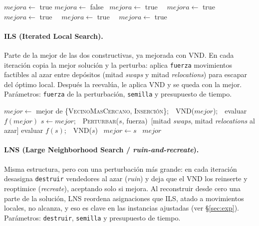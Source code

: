 \documentclass[11pt,a4paper]{article}
\newcommand{\code}[1]{\texttt{#1}}
\begin{document}
\begin{algorithm}[H]
\caption{Metaheurística: VND (Variable Neighborhood Descent)}
\begin{algorithmic}[1]
  \State $mejora \gets$ true
    \State $mejora \gets$ false
    \ $mejora \gets$ true\ \EndWhile
    \ $mejora \gets$ true\ \EndWhile
      \ $mejora \gets$ true\ \EndWhile
      \ $mejora \gets$ true\ \EndWhile
    \EndFor
    \ $mejora \gets$ true\ \EndWhile
  \EndWhile
\EndFunction
\end{algorithmic}
\end{algorithm}

\paragraph{ILS (Iterated Local Search).} Parte de la mejor de las dos constructivas, ya mejorada
con VND. En cada iteración copia la mejor solución y la perturba: aplica \code{fuerza}
movimientos factibles al azar entre depósitos (mitad \emph{swaps} y mitad \emph{relocations})
para escapar del óptimo local. Después la reevalúa, le aplica VND y se queda con la mejor.
Parámetros: \code{fuerza} de la perturbación, \code{semilla} y presupuesto de tiempo.

\begin{algorithm}[H]
\caption{Metaheurística: ILS (Iterated Local Search)}
\begin{algorithmic}[1]
  \State $mejor \gets$ mejor de \{\textsc{VecinoMasCercano}, \textsc{Inserción}\};\ \ \textsc{VND}($mejor$);\ \ evaluar $f(mejor)$
    \State $s \gets mejor$;\ \ \textsc{Perturbar}($s$, fuerza)\ \small{[mitad \textit{swaps}, mitad \textit{relocations} al azar]}
    \State evaluar $f(s)$;\ \ \textsc{VND}($s$)
    \ $mejor \gets s$\ \EndIf
  \EndWhile
  \State \Return $mejor$
\EndFunction
\end{algorithmic}
\end{algorithm}

\paragraph{LNS (Large Neighborhood Search / \emph{ruin-and-recreate}).} Misma estructura, pero
con una perturbación más grande: en cada iteración desasigna \code{destruir} vendedores al azar
(\emph{ruin}) y deja que el VND los reinserte y reoptimice (\emph{recreate}), aceptando solo si
mejora. Al reconstruir desde cero una parte de la solución, LNS reordena asignaciones que ILS,
atado a movimientos locales, no alcanza, y eso es clave en las instancias ajustadas (ver
\S\ref{sec:exp}). Parámetros: \code{destruir}, \code{semilla} y presupuesto de tiempo.
\end{document}
